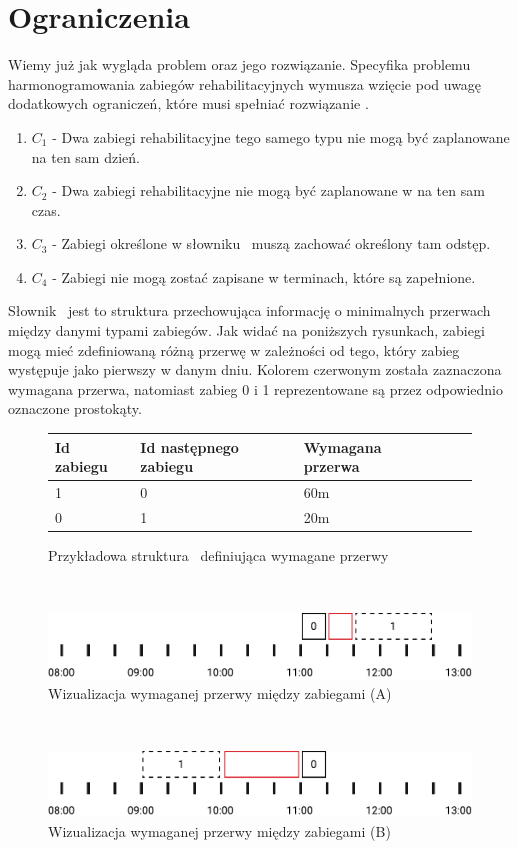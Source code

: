 \section{Ograniczenia}
Wiemy już jak wygląda problem oraz jego rozwiązanie. Specyfika problemu
harmonogramowania zabiegów rehabilitacyjnych wymusza wzięcie pod uwagę
dodatkowych ograniczeń, które musi spełniać rozwiązanie \sSol.
\begin{enumerate}
	\item{$C_1$ - Dwa zabiegi rehabilitacyjne tego samego typu nie mogą być
		zaplanowane na ten sam dzień.}
	\item{$C_2$ - Dwa zabiegi rehabilitacyjne nie mogą być zaplanowane w na ten sam czas.}
	\item{$C_3$ - Zabiegi określone w słowniku \sGap\ muszą zachować określony tam odstęp.}
	\item{$C_4$ - Zabiegi nie mogą zostać zapisane w terminach, które są zapełnione.}
\end{enumerate}
Słownik \sGap\ jest to struktura przechowująca informację o minimalnych
przerwach między danymi typami zabiegów.
Jak widać na poniższych rysunkach, zabiegi mogą mieć zdefiniowaną różną przerwę
w zależności od tego, który zabieg występuje jako pierwszy w danym dniu. Kolorem
czerwonym została zaznaczona wymagana przerwa, natomiast zabieg 0 i 1
reprezentowane są przez odpowiednio oznaczone prostokąty.
\\
\begin{figure}[h]
	\centering
	\begin{tabular}{ l l l l l }
		Id zabiegu & Id następnego zabiegu & Wymagana przerwa \\
	\hline
		1 & 0 & 60m \\
		0 & 1 & 20m \\
	\end{tabular}
	\caption{Przykładowa struktura \sGap\ definiująca wymagane przerwy}
	\label{example-gaps}
\end{figure}
\\
\begin{figure}[h]
	\centering
	\includegraphics[width=\textwidth]{gfx/gap_1.pdf}
	\caption{Wizualizacja wymaganej przerwy między zabiegami (A)}
	\label{example-gaps-1}
\end{figure}
\\
\begin{figure}[h]
	\centering
	\includegraphics[width=\textwidth]{gfx/gap_2.pdf}
	\caption{Wizualizacja wymaganej przerwy między zabiegami (B)}
	\label{example-gaps-2}
\end{figure}
\pagebreak
